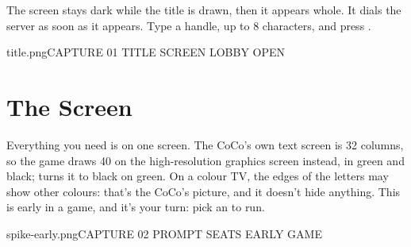 \documentclass[12pt,letterpaper]{article}
\begin{document}
The screen stays dark while the title is drawn, then it appears whole. It dials the server as soon as it
appears. Type a handle, up to 8 characters, and press .

\begin{capture}{title.png}{CAPTURE 01 \quad TITLE SCREEN \quad LOBBY OPEN}
\end{capture}

\begin{legend}
\end{legend}

\renewcommand{\secstatus}{\PlatformMachines \quad // \quad HIGH RESOLUTION \quad // \quad 40 x 24}
\chapter{The Screen}
\begin{sloppypar}
Everything you need is on one screen. The CoCo's own text screen is 32 columns, so the game draws 40 on the
high-resolution graphics screen instead, in green and black; \key{\fontsize{12}{9}\selectfont$\uparrow$} turns it to black on green. On a colour TV,
the edges of the letters may show other colours: that's the CoCo's picture, and it doesn't hide anything.
This is early in a game, and it's your turn: pick an  to run.
\end{sloppypar}

\begin{capture}{spike-early.png}{CAPTURE 02 \quad \MakeUppercase{} PROMPT  SEATS \quad EARLY GAME}
\end{capture}
\end{document}
